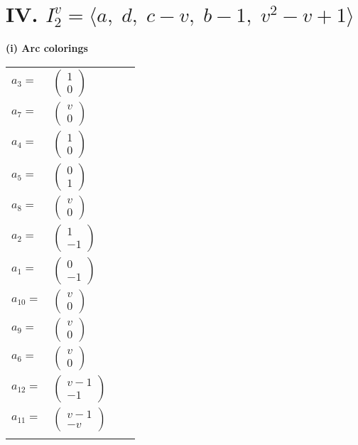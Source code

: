 \documentclass[1p]{elsarticle_modified}
\theoremstyle{definition}
\begin{document}
\centering \section*{IV. $I^v_{2}= \langle a,\;d,\;c- v,\;b-1,\;v^2- v+1 \rangle$}
\flushleft \textbf{(i) Arc colorings}\\
\begin{tabular}{m{7pt} m{180pt} m{7pt} m{180pt} }
\flushright $a_{3}=$&$\begin{pmatrix}1\\0\end{pmatrix}$ \\
\flushright $a_{7}=$&$\begin{pmatrix}v\\0\end{pmatrix}$ \\
\flushright $a_{4}=$&$\begin{pmatrix}1\\0\end{pmatrix}$ \\
\flushright $a_{5}=$&$\begin{pmatrix}0\\1\end{pmatrix}$ \\
\flushright $a_{8}=$&$\begin{pmatrix}v\\0\end{pmatrix}$ \\
\flushright $a_{2}=$&$\begin{pmatrix}1\\-1\end{pmatrix}$ \\
\flushright $a_{1}=$&$\begin{pmatrix}0\\-1\end{pmatrix}$ \\
\flushright $a_{10}=$&$\begin{pmatrix}v\\0\end{pmatrix}$ \\
\flushright $a_{9}=$&$\begin{pmatrix}v\\0\end{pmatrix}$ \\
\flushright $a_{6}=$&$\begin{pmatrix}v\\0\end{pmatrix}$ \\
\flushright $a_{12}=$&$\begin{pmatrix}v-1\\-1\end{pmatrix}$ \\
\flushright $a_{11}=$&$\begin{pmatrix}v-1\\- v\end{pmatrix}$\\&\end{tabular}
\end{document}
